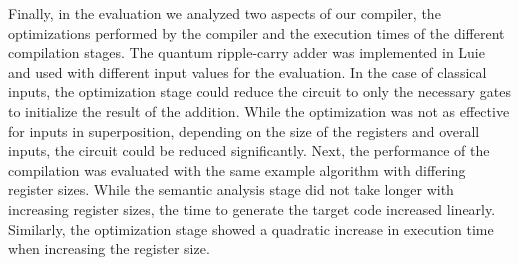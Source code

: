 Finally, in the evaluation we analyzed two aspects of our compiler, the optimizations performed by the compiler and the execution times of the different compilation stages. The quantum ripple-carry adder was implemented in Luie and used with different input values for the evaluation. In the case of classical inputs, the optimization stage could reduce the circuit to only the necessary gates to initialize the result of the addition. While the optimization was not as effective for inputs in superposition, depending on the size of the registers and overall inputs, the circuit could be reduced significantly. Next, the performance of the compilation was evaluated with the same example algorithm with differing register sizes. While the semantic analysis stage did not take longer with increasing register sizes, the time to generate the target code increased linearly. Similarly, the optimization stage showed a quadratic increase in execution time when increasing the register size.